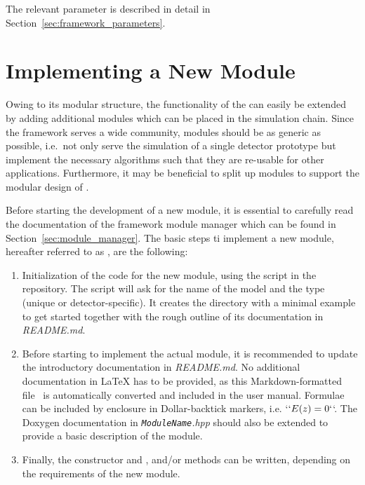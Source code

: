 The relevant parameter is described in detail in Section~\ref{sec:framework_parameters}.

\section{Implementing a New Module}
\label{sec:building_new_module}

Owing to its modular structure, the functionality of the \apsq can easily be extended by adding additional modules which can be placed in the simulation chain.
Since the framework serves a wide community, modules should be as generic as possible, i.e.\ not only serve the simulation of a single detector prototype but implement the necessary algorithms such that they are re-usable for other applications.
Furthermore, it may be beneficial to split up modules to support the modular design of \apsq.

Before starting the development of a new module, it is essential to carefully read the documentation of the framework module manager which can be found in Section~\ref{sec:module_manager}.
The basic steps ti implement a new module, hereafter referred to as , are the following:
\begin{enumerate}
    \item Initialization of the code for the new module, using the script  in the repository.
    The script will ask for the name of the model and the type (unique or detector-specific).
    It creates the directory with a minimal example to get started together with the rough outline of its documentation in \textit{README.md}.
    \item Before starting to implement the actual module, it is recommended to update the introductory documentation in \textit{README.md}.
    No additional documentation in LaTeX has to be provided, as this Markdown-formatted file~\cite{markdown} is automatically converted and included in the user manual.
    Formulae can be included by enclosure in Dollar-backtick markers, i.e. `$` E(z) = 0`$`.
    The Doxygen documentation in \textit{\texttt{ModuleName}.hpp} should also be extended to provide a basic description of the module.
    \item Finally, the constructor and ,  and/or  methods can be written, depending on the requirements of the new module.
\end{enumerate}

